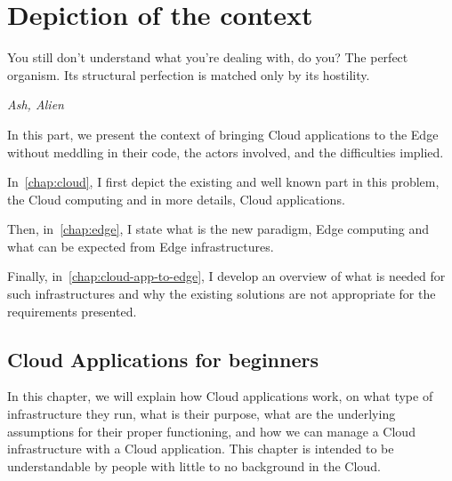 
\clearemptydoublepage
\part{Depiction of the context} %
\label{p:context}


\epigraph{You still don't understand what you're dealing with, do you? The perfect organism. Its structural perfection is matched only by its hostility.}{\emph{Ash, Alien}}

In this part, we present the context of bringing Cloud applications to
the Edge without meddling in their code, the actors involved, and the
difficulties implied.

%
In~\autoref{chap:cloud}, I first depict the existing and well
known part in this problem, the Cloud computing and in more details,
Cloud applications.

%
Then, in~\autoref{chap:edge}, I state what is the new paradigm, Edge
computing and what can be expected from Edge infrastructures.

%
Finally, in~\autoref{chap:cloud-app-to-edge}, I develop an overview
of what is needed for such infrastructures and why the existing
solutions are not appropriate for the requirements presented.

\chapter{Cloud Applications for beginners} %
\label{chap:cloud}

In this chapter, we will explain how Cloud applications work, on what
type of infrastructure they run, what is their purpose, what are the
underlying assumptions for their proper functioning, and how we can
manage a Cloud infrastructure with a Cloud application.
%
This chapter is intended to be understandable by people with little to
no background in the Cloud.

